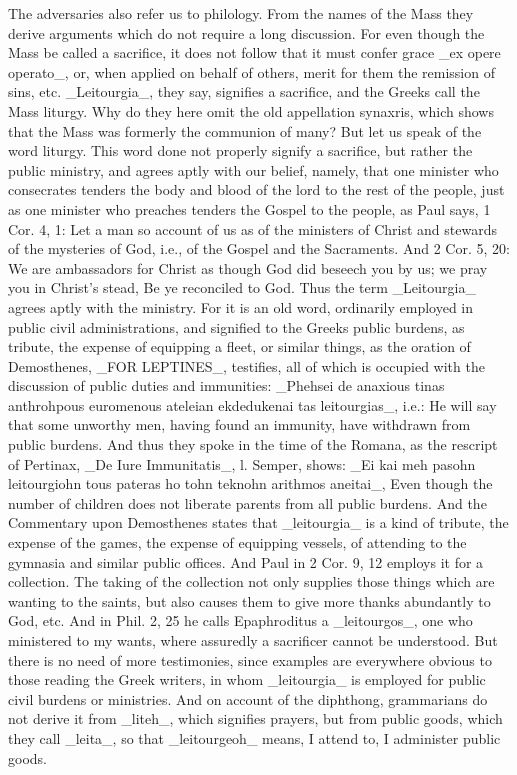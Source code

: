 The adversaries also refer us to philology.  From the names of the
Mass they derive arguments which do not require a long discussion.
For even though the Mass be called a sacrifice, it does not follow
that it must confer grace _ex opere operato_, or, when applied on
behalf of others, merit for them the remission of sins, etc.
_Leitourgia_, they say, signifies a sacrifice, and the Greeks call
the Mass liturgy.  Why do they here omit the old appellation synaxris,
which shows that the Mass was formerly the communion of many?  But
let us speak of the word liturgy.  This word done not properly
signify a sacrifice, but rather the public ministry, and agrees aptly
with our belief, namely, that one minister who consecrates tenders
the body and blood of the lord to the rest of the people, just as one
minister who preaches tenders the Gospel to the people, as Paul says,
1 Cor. 4, 1: Let a man so account of us as of the ministers of Christ
and stewards of the mysteries of God, i.e., of the Gospel and the
Sacraments.  And 2 Cor. 5, 20: We are ambassadors for Christ as
though God did beseech you by us; we pray you in Christ's stead, Be
ye reconciled to God.  Thus the term _Leitourgia_ agrees aptly with
the ministry.  For it is an old word, ordinarily employed in public
civil administrations, and signified to the Greeks public burdens, as
tribute, the expense of equipping a fleet, or similar things, as the
oration of Demosthenes, _FOR LEPTINES_, testifies, all of which is
occupied with the discussion of public duties and immunities:
_Phehsei de anaxious tinas anthrohpous euromenous ateleian
ekdedukenai tas leitourgias_, i.e.: He will say that some unworthy
men, having found an immunity, have withdrawn from public burdens.
And thus they spoke in the time of the Romana, as the rescript of
Pertinax, _De Iure Immunitatis_, l.  Semper, shows: _Ei kai meh
pasohn leitourgiohn tous pateras ho tohn teknohn arithmos aneitai_,
Even though the number of children does not liberate parents from all
public burdens.  And the Commentary upon Demosthenes states that
_leitourgia_ is a kind of tribute, the expense of the games, the
expense of equipping vessels, of attending to the gymnasia and
similar public offices.  And Paul in 2 Cor. 9, 12 employs it for a
collection.  The taking of the collection not only supplies those
things which are wanting to the saints, but also causes them to give
more thanks abundantly to God, etc. And in Phil. 2, 25 he calls
Epaphroditus a _leitourgos_, one who ministered to my wants, where
assuredly a sacrificer cannot be understood.  But there is no need of
more testimonies, since examples are everywhere obvious to those
reading the Greek writers, in whom _leitourgia_ is employed for
public civil burdens or ministries.  And on account of the diphthong,
grammarians do not derive it from _liteh_, which signifies prayers,
but from public goods, which they call _leita_, so that _leitourgeoh_
means, I attend to, I administer public goods.

